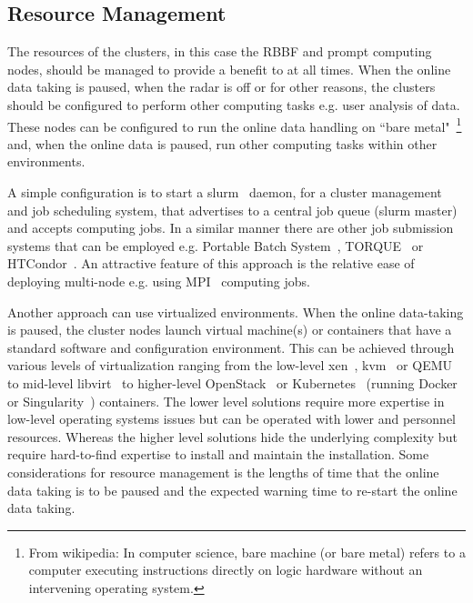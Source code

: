 \documentclass[12pt,a4paper]{article}
\begin{document}


\subsection{Resource Management} \label{ssec:resource}
The resources of the clusters, in this case the RBBF and prompt computing nodes, should be managed to provide a benefit to \ED at all times.
When the online data taking is paused, when the radar is off or for other reasons, the clusters should be configured to perform other computing tasks e.g. user analysis of data.
These nodes can be configured to run the online data handling on ``bare metal"~\footnote{From wikipedia: In computer science, bare machine (or bare metal) refers to a computer executing instructions directly on logic hardware without an intervening operating system.} and, when the online data is paused, run other computing tasks within other environments.

A simple configuration is to start a slurm~\cite{slurm} daemon, for a cluster management and job scheduling system, that advertises to a central job queue (slurm master) and accepts computing jobs.
In a similar manner there are other job submission systems that can be employed e.g. Portable Batch System~\cite{pbs}, TORQUE~\cite{torque} or HTCondor~\cite{htcondor}.
An attractive feature of this approach is the relative ease of deploying multi-node e.g. using MPI~\cite{mpi} computing jobs.

Another approach can use virtualized environments.
When the online data-taking is paused, the cluster nodes launch virtual machine(s) or containers that have a standard \ED software and configuration environment.
This can be achieved through various levels of virtualization ranging from the low-level xen~\cite{xen}, kvm~\cite{kvm} or QEMU~\cite{qemu} to mid-level libvirt~\cite{libvirt} to higher-level OpenStack~\cite{openstack} or Kubernetes~\cite{kubernetes}
(running Docker~\cite{docker} or Singularity~\cite{singularity}) containers.
The lower level solutions require more expertise in low-level operating systems issues but can be operated with lower \einfra and personnel resources.
Whereas the higher level solutions hide the underlying complexity but require hard-to-find expertise to install and maintain the installation.
Some considerations for resource management is the lengths of time that the online data taking is to be paused and the expected warning time to re-start the online data taking.
\end{document}
